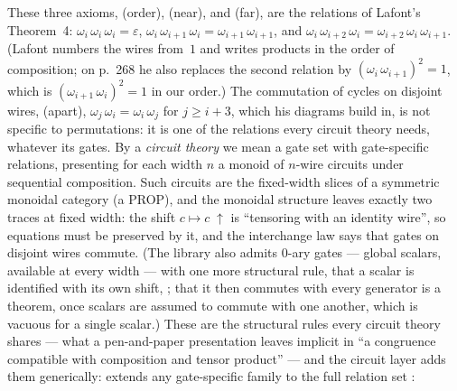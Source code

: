 \noindent These three axioms, (order), (near), and (far), are the relations of Lafont's Theorem~4: $\omega_i\,\omega_i\,\omega_i = \varepsilon$, $\omega_i\,\omega_{i+1}\,\omega_i = \omega_{i+1}\,\omega_{i+1}$, and $\omega_i\,\omega_{i+2}\,\omega_i = \omega_{i+2}\,\omega_i\,\omega_{i+1}$. (Lafont numbers the wires from~$1$ and writes products in the order of composition; on p.~268 he also replaces the second relation by $(\omega_i\,\omega_{i+1})^2=1$, which is $(\omega_{i+1}\,\omega_i)^2=1$ in our order.) The commutation of cycles on disjoint wires, (apart), $\omega_j\,\omega_i = \omega_i\,\omega_j$ for $j \ge i+3$, which his diagrams build in, is not specific to permutations: it is one of the relations every circuit theory needs, whatever its gates. By a \emph{circuit theory} we mean a gate set with gate-specific relations, presenting for each width $n$ a monoid of $n$-wire circuits under sequential composition. Such circuits are the fixed-width slices of a symmetric monoidal category (a PROP), and the monoidal structure leaves exactly two traces at fixed width: the shift $c \mapsto c\;{\uparrow}$ is ``tensoring with an identity wire'', so equations must be preserved by it, and the interchange law says that gates on disjoint wires commute. (The library also admits $0$-ary gates --- global scalars, available at every width --- with one more structural rule, that a scalar is identified with its own shift, ; that it then commutes with every generator is a theorem, once scalars are assumed to commute with one another, which is vacuous for a single scalar.) These are the structural rules every circuit theory shares --- what a pen-and-paper presentation leaves implicit in ``a congruence compatible with composition and tensor product'' --- and the circuit layer adds them generically:  extends any gate-specific family to the full relation set :
